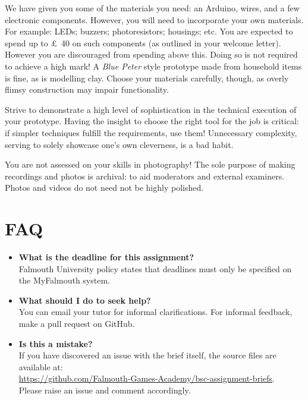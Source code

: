 \documentclass{../../fal_assignment}
\begin{document}
We have given you some of the materials you need: an Arduino, wires, and a few electronic components. However, you will need to incorporate your own materials. For example: LEDs; buzzers; photoresistors; housings; etc. You are expected to spend up to \pounds~40 on such components (as outlined in your welcome letter). However you are discouraged from spending above this. Doing so is not required to achieve a high mark! A \textit{Blue Peter} style prototype made from household items is fine, as is modelling clay. Choose your materials carefully, though, as overly flimsy construction may impair functionality. 

Strive to demonstrate a high level of sophistication in the technical execution of your prototype. Having the insight to choose the right tool for the job is critical: if simpler techniques fulfill the requirements, use them! Unnecessary complexity, serving to solely showcase one's own cleverness, is a bad habit. 

You are not assessed on your skills in photography! The sole purpose of making recordings and photos is archival: to aid moderators and external examiners. Photos and videos do not need not be highly polished. 

\section*{FAQ}

\begin{itemize}
	\item 	\textbf{What is the deadline for this assignment?} \\ 
    		Falmouth University policy states that deadlines must only be specified on the MyFalmouth system.
    		
	\item 	\textbf{What should I do to seek help?} \\ 
    		You can email your tutor for informal clarifications. For informal feedback, make a pull request on GitHub. 
    		
    	\item 	\textbf{Is this a mistake?} \\ 	
    		If you have discovered an issue with the brief itself, the source files are available at: \\
    		\url{https://github.com/Falmouth-Games-Academy/bsc-assignment-briefs}.\\
    		 Please raise an issue and comment accordingly.
\end{itemize}
\end{document}
